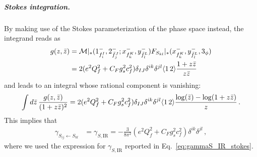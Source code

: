 \subparagraph{Stokes integration.}
%
By making use of the Stokes parameterization of the phase space instead,
the integrand reads as
\begin{align}
    g(z,\bar{z}) &=\mathcal M|_*(1_{f_i^I}^-,2_{\bar f_j^J}^-;x^{-}_{f_k^K},y^{-}_{\bar f_l^L})F_{S_{kl}}|_*(x^{-}_{f_k^K},y^{-}_{\bar f_l^L},3_\phi)
    \nonumber \\
    &=2 (e^2Q_f^2+C_Fg_s^2c_f^2)\delta_{IJ}\delta^{ik}\delta^{jl}\langle1\, 2 \rangle \frac{1+z \bar{z}}{z \bar{z}} 
\end{align}
and leads to an integral whose rational component is vanishing:
\begin{equation}
    \int d\bar{z} \,\frac{g(z,\bar{z})}{(1+z\bar{z})^2} = 2 (e^2Q_f^2+C_Fg_s^2c_f^2)\delta_{IJ}\delta^{ik}\delta^{jl}\langle1\, 2 \rangle \frac{\log(\bar{z})-\log(1+z\bar{z})}{z}\,.
\end{equation}
This implies that
\begin{align}
    \gamma_{S_{ij}\leftarrow S_{kl}}&= \gamma_{S,\text{IR}} = -\frac{3}{8\pi^2}(e^2Q_f^2+C_Fg_s^2c_f^2)\delta^{ik}\delta^{jl} \,,
\end{align}
where we used the expression for $\gamma_{S,\text{IR}}$ reported in Eq.~\eqref{eq:gammaS_IR_stokes}.

